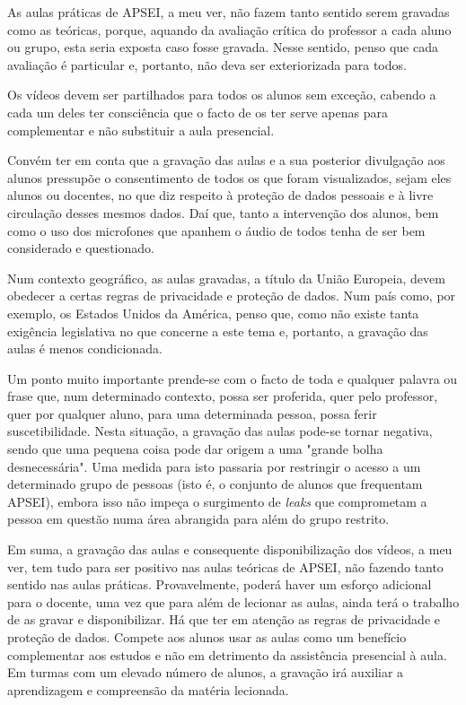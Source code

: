\documentclass[portuguese, 11pt, a4paper, titlepage, oneside]{article}
\begin{document}
As aulas práticas de APSEI, a meu ver, não fazem tanto sentido serem gravadas como as teóricas, porque, aquando da avaliação crítica do professor a cada aluno ou grupo, esta seria exposta caso fosse gravada. Nesse sentido, penso que cada avaliação é particular e, portanto, não deva ser exteriorizada para todos.

Os vídeos devem ser partilhados para todos os alunos sem exceção, cabendo a cada um deles ter consciência que o facto de os ter serve apenas para complementar e não substituir a aula presencial.

Convém ter em conta que a gravação das aulas e a sua posterior divulgação aos alunos pressupõe o consentimento de todos os que foram visualizados, sejam eles alunos ou docentes, no que diz respeito à proteção de dados pessoais e à livre circulação desses mesmos dados. Daí que, tanto a intervenção dos alunos, bem como o uso dos microfones que apanhem o áudio de todos tenha de ser bem considerado e questionado.

Num contexto geográfico, as aulas gravadas, a título da União Europeia, devem obedecer a certas regras de privacidade e proteção de dados. Num país como, por exemplo, os Estados Unidos da América, penso que, como não existe tanta exigência legislativa no que concerne a este tema e, portanto, a gravação das aulas é menos condicionada.

Um ponto muito importante prende-se com o facto de toda e qualquer palavra ou frase que, num determinado contexto, possa ser proferida, quer pelo professor, quer por qualquer aluno, para uma determinada pessoa, possa ferir suscetibilidade. Nesta situação, a gravação das aulas pode-se tornar negativa, sendo que uma pequena coisa pode dar origem a uma "grande bolha desnecessária". Uma medida para isto passaria por restringir o acesso a um determinado grupo de pessoas (isto é, o conjunto de alunos que frequentam APSEI), embora isso não impeça o surgimento de \textit{leaks} que comprometam a pessoa em questão numa área abrangida para além do grupo restrito.

Em suma, a gravação das aulas e consequente disponibilização dos vídeos, a meu ver, tem tudo para ser positivo nas aulas teóricas de APSEI, não fazendo tanto sentido nas aulas práticas. Provavelmente, poderá haver um esforço adicional para o docente, uma vez que para além de lecionar as aulas, ainda terá o trabalho de as gravar e disponibilizar. Há que ter em atenção as regras de privacidade e proteção de dados. Compete aos alunos usar as aulas como um benefício complementar aos estudos e não em detrimento da assistência presencial à aula. Em turmas com um elevado número de alunos, a gravação irá auxiliar a aprendizagem e compreensão da matéria lecionada.
\end{document}
